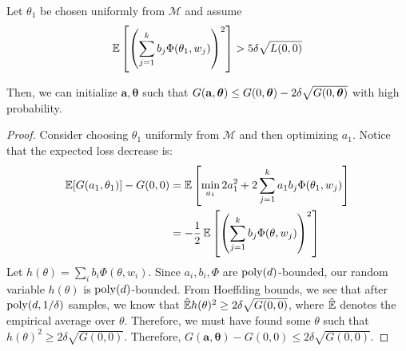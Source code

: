  \begin{observation}\label{initialize}
Let $\theta_1$ be chosen uniformly from $\mathcal{M}$ and assume
\[ \operatorname*{\mathbb{E}}\left[\left(  \sum_{j=1}^k b_j \Phi(\theta_1,w_j)\right)^2\right] > 5\delta\sqrt{L(0,0)}\] 

Then, we can initialize $\boldsymbol{a,\theta}$ such that $G({\bf a, \boldsymbol{\theta}}) \leq G(0,\boldsymbol{\theta}) - 2\delta\sqrt{G(0,\boldsymbol{\theta})}$ with high probability.
 \end{observation}
 
 \begin{proof}
   Consider choosing $\theta_1$ uniformly from $\mathcal{M}$ and then
   optimizing $a_1$. Notice that the expected loss decrease is:
%
\begin{align*}
  \operatorname*{\mathbb{E}}[ G(a_1,\theta_1)] - G(0,0) & = \operatorname*{\mathbb{E}}\left [\min_{a_1} 2a_1^2 +
  2\sum_{j=1}^k a_1 b_j\Phi(\theta_1,w_j)\right] \\
 & = -\frac{1}{2}\operatorname*{\mathbb{E}}\left[\left(  \sum_{j=1}^k b_j
   \Phi(\theta,w_j)\right)^2\right] 
\end{align*}
Let
$h(\theta) = \sum_i b_i \Phi(\theta, w_i)$. Since $a_i,b_i, \Phi$ are
$\mathrm{poly}(d)$-bounded, our random variable $h(\theta)$ is
$\mathrm{poly}(d)$-bounded. From Hoeffding bounds, we see that after
$\mathrm{poly}(d,1/\delta)$ samples, we know that
$\hat{\operatorname*{\mathbb{E}}}h(\theta)^2 \geq 2\delta\sqrt{G(0,0)}$, where
$\hat{\operatorname*{\mathbb{E}}}$ denotes the empirical average over $\theta$. Therefore,
we must have found some $\theta$ such that
$h(\theta)^2 \geq 2\delta \sqrt{G(0,0)}$. Therefore,
$G(\boldsymbol{a,\theta}) - G(0,0) \leq 2\delta \sqrt{G(0,0)}$.
\end{proof}
 
